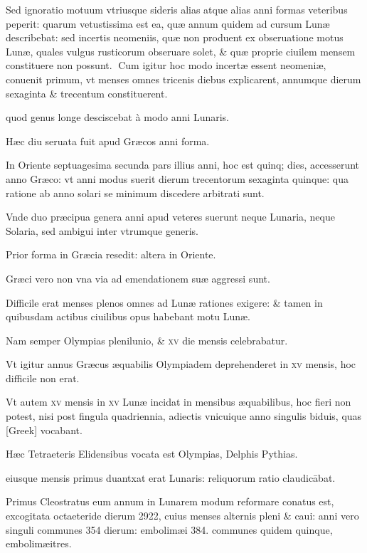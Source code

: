 \begin{parnumbers}

Sed ignoratio motuum vtriusque sideris alias atque alias anni formas veteribus  peperit: quarum vetustissima est ea, quæ annum quidem ad cursum Lunæ describebat: sed incertis neomeniis, quæ non produent ex obseruatione motus Lunæ, quales vulgus rusticorum obseruare solet, \& quæ proprie ciuilem mensem constituere non possunt.
Cum igitur hoc modo incertæ essent neomeniæ, conuenit primum, vt menses omnes tricenis diebus explicarent, annumque dierum sexaginta \& trecentum constituerent.

quod genus longe desciscebat à modo anni Lunaris.

Hæc diu seruata fuit apud Græcos anni forma.

In Oriente septuagesima secunda pars illius anni, hoc est quinq; dies, accesserunt anno Græco: vt anni modus suerit dierum trecentorum sexaginta quinque:  qua ratione ab anno solari se minimum discedere arbitrati sunt.

Vnde duo præcipua genera anni apud veteres suerunt neque Lunaria, neque Solaria, sed ambigui inter vtrumque generis.

Prior forma in Græcia resedit: altera in Oriente.

Græci vero non vna via ad emendationem suæ aggressi sunt.

Difficile erat menses plenos omnes ad Lunæ rationes exigere: \& tamen in quibusdam actibus ciuilibus opus habebant motu Lunæ.

Nam semper Olympias plenilunio, \& \textsc{xv} die mensis celebrabatur.

Vt igitur annus Græcus æquabilis Olympiadem deprehenderet in \textsc{xv} mensis, hoc difficile non erat.

Vt autem \textsc{xv} mensis in \textsc{xv} Lunæ incidat in mensibus æquabilibus, hoc fieri non potest, nisi post fingula quadriennia, adiectis vnicuique anno singulis  biduis, quas \textgreek{[Greek]} vocabant.

Hæc Tetraeteris Elidensibus vocata est Olympias, Delphis Pythias.

eiusque mensis primus duantxat erat Lunaris: reliquorum ratio claudicābat.

Primus Cleostratus eum annum in Lunarem modum reformare conatus est, excogitata octaeteride dierum 2922, cuius menses alternis pleni \& caui: anni vero singuli communes 354 dierum: embolimæi 384. communes quidem quinque, embolimæitres.


\end{parnumbers}
